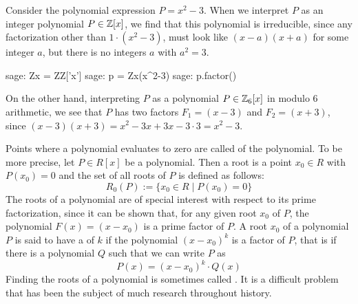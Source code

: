 \begin{example}
\label{example:irreducible_integer_polynomial_1}
 Consider the polynomial expression $P=x^2-3$. When we interpret $P$ as an integer polynomial $P\in\mathbb{Z}[x]$, we find that this polynomial is irreducible, since any factorization other than $1\cdot(x^2-3)$, must look like $(x-a)(x+a)$ for some integer $a$, but there is no integers $a$ with $a^2=3$.
\begin{sagecommandline}
sage: Zx = ZZ['x']
sage: p = Zx(x^2-3)
sage: p.factor()
\end{sagecommandline}
On the other hand, interpreting $P$ as a polynomial $P\in \mathbb{Z}_6[x]$ in modulo $6$ arithmetic, we see that $P$ has two factors $F_1=(x-3)$ and $F_2=(x+3)$, since
$(x-3)(x+3)= x^2 -3x +3x -3\cdot 3= x^2-3$.
\end{example}
Points where a polynomial evaluates to zero are called  of the polynomial. To be more precise, let $P\in R[x]$ be a polynomial. Then a root is a point $x_0\in R$ with $P(x_0)=0$ and the set of all roots of $P$ is defined as follows:
\begin{equation}
R_0(P):=\{x_0\in R\;|\; P(x_0)=0\}
\end{equation}
The roots of a polynomial are of special interest with respect to its prime factorization, since it can be shown that, for any given root $x_0$ of $P$, the polynomial $F(x)=(x-x_0)$ is a prime factor of $P$. A root $x_0$ of a polynomial $P$ is said to have a  of $k$ if the polynomial $(x-x_0)^k$ is a factor of $P$, that is if there is a polynomial $Q$ such that we can write $P$ as
\begin{equation}
P(x)= (x-x_0)^k \cdot Q(x)
\end{equation}
Finding the roots of a polynomial is sometimes called . It is a difficult problem that has been the subject of much research throughout history.

